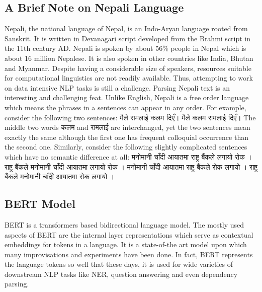 \subsection*{A Brief Note on Nepali Language}
Nepali, the national language of Nepal, is an Indo-Aryan language rooted from
Sanskrit. It is written in Devanagari script developed from  the  Brahmi
script in the 11th century AD. Nepali is spoken by about 56\% people in Nepal
which is about 16 million Nepalese. It is also spoken in other countries like
India, Bhutan and Myanmar. Despite having a considerable size of speakers,
resources suitable for computational linguistics are not readily available.
Thus, attempting to work on data intensive NLP tasks is still a challenge.
\newline
\newline
Parsing Nepali text is an interesting and challenging feat. Unlike English,
Nepali is a free order language which means the phrases in a sentences can
appear in any order. For example, consider the following two sentences:
\newline
\newline
{\dev
मैले रामलाई कलम दिएँ।
\newline
मैले कलम रामलाई दिएँ।
}
\newline
\newline
The middle two words {\dev कलम }and {\dev रामलाई} are interchanged, yet the two
sentences mean exactly the same although the first one has frequent colloquial
occurrence than the second one. Similarly, consider the following slightly
complicated sentences which have no semantic difference at all:
\newline
\newline
{\dev
मनोमानी चाँदी आयातमा राष्ट्र बैंकले लगायो रोक ।
\newline
राष्ट्र बैंकले मनोमानी चाँदी आयातमा लगायो रोक ।
\newline
मनोमानी चाँदी आयातमा राष्ट्र बैंकले रोक लगायो ।
\newline
राष्ट्र बैंकले मनोमानी चाँदी आयातमा रोक लगायो ।
}

\subsection*{BERT Model}
BERT is a transformers based bidirectional language model. The mostly used
aspects of BERT are the internal layer representations which serve as
contextual embeddings for tokens in a language. It is a state-of-the art model
upon which many improvisations and experiments have been done. In fact, BERT
represents the language tokens so well that these days, it is used for wide
varieties of downstream NLP tasks like NER, question answering and even
dependency parsing.

